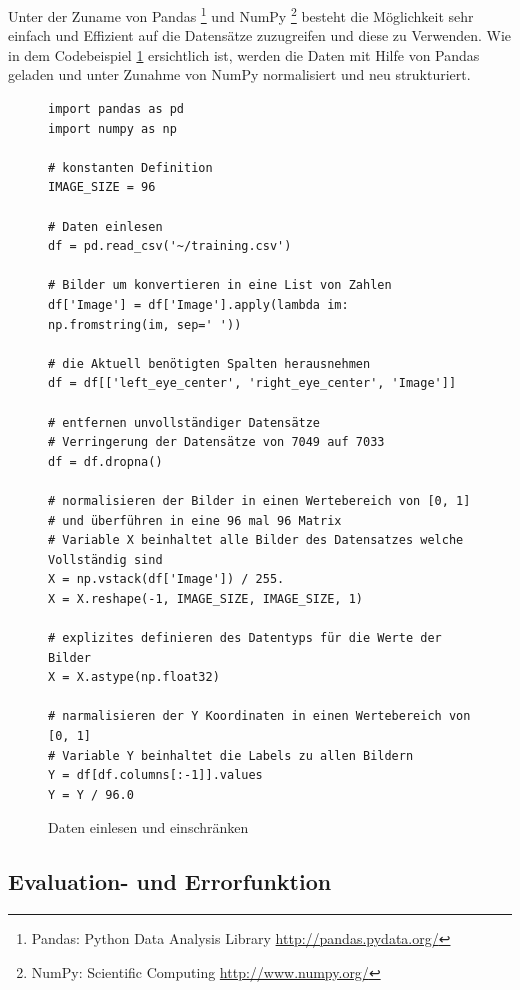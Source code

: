 \noindent
Unter der Zuname von Pandas \footnote{Pandas: Python Data Analysis Library \url{http://pandas.pydata.org/}} und NumPy \footnote{NumPy: Scientific Computing \url{http://www.numpy.org/}} besteht die Möglichkeit sehr einfach und Effizient auf die Datensätze zuzugreifen und diese zu Verwenden. 
Wie in dem Codebeispiel \ref{fig:datenLesenEinschränken} ersichtlich ist, werden die Daten mit Hilfe von Pandas geladen und unter Zunahme von NumPy normalisiert und neu strukturiert. 
\begin{figure}[ht!]
\lstset{language=Python}
\begin{lstlisting}
import pandas as pd
import numpy as np

# konstanten Definition
IMAGE_SIZE = 96

# Daten einlesen
df = pd.read_csv('~/training.csv')

# Bilder um konvertieren in eine List von Zahlen
df['Image'] = df['Image'].apply(lambda im: np.fromstring(im, sep=' '))

# die Aktuell benötigten Spalten herausnehmen
df = df[['left_eye_center', 'right_eye_center', 'Image']]

# entfernen unvollständiger Datensätze
# Verringerung der Datensätze von 7049 auf 7033
df = df.dropna()

# normalisieren der Bilder in einen Wertebereich von [0, 1] 
# und überführen in eine 96 mal 96 Matrix
# Variable X beinhaltet alle Bilder des Datensatzes welche Vollständig sind
X = np.vstack(df['Image']) / 255.
X = X.reshape(-1, IMAGE_SIZE, IMAGE_SIZE, 1)

# explizites definieren des Datentyps für die Werte der Bilder
X = X.astype(np.float32)

# narmalisieren der Y Koordinaten in einen Wertebereich von [0, 1]
# Variable Y beinhaltet die Labels zu allen Bildern
Y = df[df.columns[:-1]].values
Y = Y / 96.0
\end{lstlisting}
	\caption{Daten einlesen und einschränken}
	\label{fig:datenLesenEinschränken}
\end{figure}

\subsection{Evaluation- und Errorfunktion}

